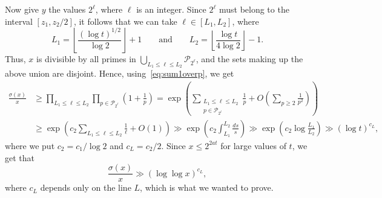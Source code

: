 \documentclass[twoside,amsthm]{elsart}
\def\cP{\mathcal{P}}
\begin{document}
Now give $y$ the values $2^{\ell}$, where $\ell$ is an integer.
Since $2^{\ell}$ must belong to the interval $[z_1,z_2/2]$, it
follows that we can take $\ell\in [L_1,L_2]$, where
$$
L_1 = \left\lfloor \frac{(\log t)^{1/2}}{\log 2}\right\rfloor + 1
\qquad {\text{and}}\qquad L_2
= \left\lfloor \frac{\log t}{4\log 2}\right\rfloor-1.
$$
Thus, $x$ is divisible by all primes in $\bigcup_{L_1\le \ell
\le L_2} \cP_{2^{\ell}}$, and the sets making up the above
union are disjoint. Hence, using~\eqref{eq:sum1overp}, we get
\begin{align*}
\frac{\sigma\left(x\right)}{x}
& \ge \prod_{L_1\le \ell\le L_2}
\prod_{p\in \cP_{2^{\ell}}}\left(1+\frac{1}{p}\right)
= \exp\left(\sum_{\substack{L_1\le \ell\le L_2\\ p\in \cP_{2^{\ell}}}}
\frac{1}{p} + O\left(\sum_{p\ge 2} \frac{1}{p^2}\right)\right)\\
& \ge \exp\left(c_2\sum_{L_1\le \ell\le L_2} \frac{1}{\ell} +
O(1)\right)
\gg \exp\left(c_2\int_{L_1}^{L_2}\frac{ds}{s}\right) 
\gg \exp\left(c_2\log\frac{L_1}{L_2}\right) \gg (\log t)^{c_L},
\end{align*}
where we put $c_2=c_1/\log 2$ and $c_L=c_2/2$. Since $x\le 2^{2at}$
for large values of $t$, we get that
$$
\frac{\sigma(x)}{x} \gg \left(\log\log x\right)^{c_L},
$$
where $c_L$ depends only on the line $L$, which is what we wanted to
prove.
\end{document}
